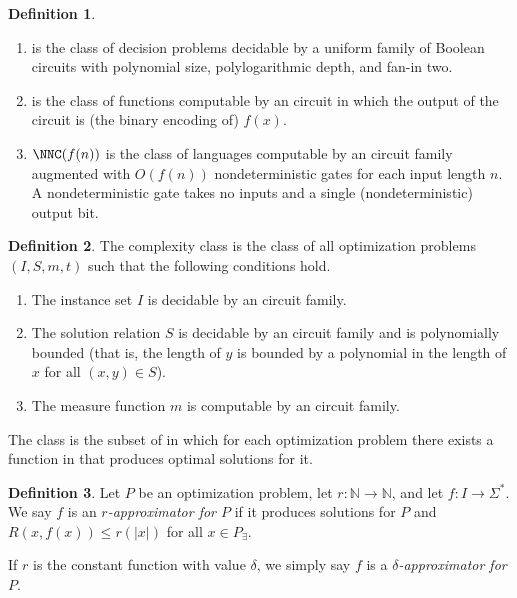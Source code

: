 \documentclass[draft]{article}
\theoremstyle{definition}
\newtheorem{definition}{Definition}
\begin{document}
\begin{definition}
  \mbox{}
  \begin{enumerate}
  \item \NC{} is the class of decision problems decidable by a uniform family of Boolean circuits with polynomial size, polylogarithmic depth, and fan-in two.
  \item \FNC{} is the class of functions computable by an \NC{} circuit in which the output of the circuit is (the binary encoding of) $f(x)$.
  \item $\NNC(f(n))$ \cite{wolf94} is the class of languages computable by an \NC{} circuit family augmented with $O(f(n))$ nondeterministic gates for each input length $n$.
    A nondeterministic gate takes no inputs and a single (nondeterministic) output bit.
  \end{enumerate}
\end{definition}

\begin{definition}
  The complexity class \NNCO{} is the class of all optimization problems $(I, S, m, t)$ such that the following conditions hold.
  \begin{enumerate}
  \item The instance set $I$ is decidable by an \NC{} circuit family.
  \item The solution relation $S$ is decidable by an \NC{} circuit family and is polynomially bounded (that is, the length of $y$ is bounded by a polynomial in the length of $x$ for all $(x, y)\in S$).
  \item The measure function $m$ is computable by an \FNC{} circuit family.
  \end{enumerate}

  The class \NCO{} is the subset of \NNCO{} in which for each optimization problem there exists a function in \FNC{} that produces optimal solutions for it.
\end{definition}

\begin{definition}
  Let $P$ be an optimization problem, let $r\colon \mathbb{N}\to\mathbb{N}$, and let $f\colon I\to \Sigma^*$.
  We say $f$ is an \emph{$r$-approximator for $P$} if it produces solutions for $P$ and $R(x, f(x)) \leq r(|x|)$ for all $x\in P_\exists$.

  If $r$ is the constant function with value $\delta$, we simply say $f$ is a \emph{$\delta$-approximator for $P$}.
\end{definition}
\end{document}
